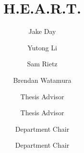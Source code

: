 \documentclass{scu-thesis}
\author{Jake Day}
\author{Yutong Li}
\author{Sam Rietz}
\author{Brendan Watamura}
\title{H.E.A.R.T.}
\begin{document}
\frontmatter
\signature{Thesis Advisor}
\signature{Thesis Advisor}
\signature{Department Chair}
\signature{Department Chair}

\maketitle


\tableofcontents
\listoffigures
\listoftables

\mainmatter












\backmatter
\end{document}

